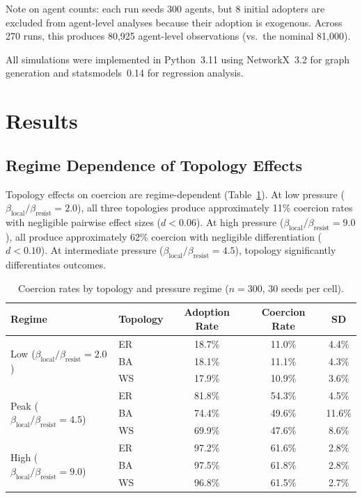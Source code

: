 \documentclass[11pt, a4paper]{article}
\newcommand{\betalocal}{\beta_{\text{local}}}
\newcommand{\betaresist}{\beta_{\text{resist}}}
\begin{document}
Note on agent counts: each run seeds 300 agents, but 8 initial adopters are excluded from agent-level analyses because their adoption is exogenous. Across 270 runs, this produces 80{,}925 agent-level observations (vs.\ the nominal 81{,}000).

All simulations were implemented in Python~3.11 using NetworkX~3.2 for graph generation and statsmodels~0.14 for regression analysis.

\section{Results}
\label{sec:results}

\subsection{Regime Dependence of Topology Effects}

Topology effects on coercion are regime-dependent (Table~\ref{tab:regimes}). At low pressure ($\betalocal/\betaresist = 2.0$), all three topologies produce approximately 11\% coercion rates with negligible pairwise effect sizes ($d < 0.06$). At high pressure ($\betalocal/\betaresist = 9.0$), all produce approximately 62\% coercion with negligible differentiation ($d < 0.10$). At intermediate pressure ($\betalocal/\betaresist = 4.5$), topology significantly differentiates outcomes.

\begin{table}[H]
\centering
\caption{Coercion rates by topology and pressure regime ($n = 300$, 30 seeds per cell).}
\label{tab:regimes}
\begin{tabular}{llccc}
\toprule
\textbf{Regime} & \textbf{Topology} & \textbf{Adoption Rate} & \textbf{Coercion Rate} & \textbf{SD} \\
\midrule
\multirow{3}{*}{Low ($\betalocal/\betaresist = 2.0$)}
    & ER & 18.7\% & 11.0\% & 4.4\% \\
    & BA & 18.1\% & 11.1\% & 4.3\% \\
    & WS & 17.9\% & 10.9\% & 3.6\% \\
\midrule
\multirow{3}{*}{Peak ($\betalocal/\betaresist = 4.5$)}
    & ER & 81.8\% & 54.3\% & 4.5\% \\
    & BA & 74.4\% & 49.6\% & 11.6\% \\
    & WS & 69.9\% & 47.6\% & 8.6\% \\
\midrule
\multirow{3}{*}{High ($\betalocal/\betaresist = 9.0$)}
    & ER & 97.2\% & 61.6\% & 2.8\% \\
    & BA & 97.5\% & 61.8\% & 2.8\% \\
    & WS & 96.8\% & 61.5\% & 2.7\% \\
\bottomrule
\end{tabular}
\end{table}
\end{document}
